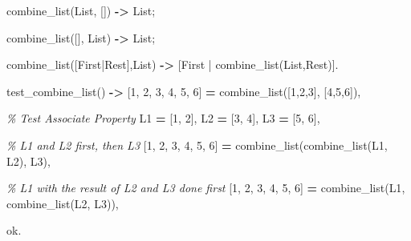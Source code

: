 \documentclass[
]{book}
\newenvironment{Shaded}{\begin{snugshade}}{\end{snugshade}}
\newcommand{\CharTok}[1]{\textcolor[rgb]{0.31,0.60,0.02}{#1}}
\newcommand{\CommentTok}[1]{\textcolor[rgb]{0.56,0.35,0.01}{\textit{#1}}}
\newcommand{\DecValTok}[1]{\textcolor[rgb]{0.00,0.00,0.81}{#1}}
\newcommand{\FunctionTok}[1]{\textcolor[rgb]{0.00,0.00,0.00}{#1}}
\newcommand{\OperatorTok}[1]{\textcolor[rgb]{0.81,0.36,0.00}{\textbf{#1}}}
\newcommand{\VariableTok}[1]{\textcolor[rgb]{0.00,0.00,0.00}{#1}}
\begin{document}
\begin{Shaded}
\begin{Highlighting}[]
\FunctionTok{combine\_list(}\VariableTok{List}\FunctionTok{,} \FunctionTok{[])} \OperatorTok{{-}\textgreater{}} \VariableTok{List}\FunctionTok{;}

\FunctionTok{combine\_list([],} \VariableTok{List}\FunctionTok{)} \OperatorTok{{-}\textgreater{}} \VariableTok{List}\FunctionTok{;}

\FunctionTok{combine\_list([}\VariableTok{First}\FunctionTok{|}\VariableTok{Rest}\FunctionTok{],}\VariableTok{List}\FunctionTok{)} \OperatorTok{{-}\textgreater{}} \FunctionTok{[}\VariableTok{First} \FunctionTok{|} \FunctionTok{combine\_list(}\VariableTok{List}\FunctionTok{,}\VariableTok{Rest}\FunctionTok{)].}

\FunctionTok{test\_combine\_list()} \OperatorTok{{-}\textgreater{}}
    \FunctionTok{[}\DecValTok{1}\FunctionTok{,} \DecValTok{2}\FunctionTok{,} \DecValTok{3}\FunctionTok{,} \DecValTok{4}\FunctionTok{,} \DecValTok{5}\FunctionTok{,} \DecValTok{6}\FunctionTok{]} \OperatorTok{=} \FunctionTok{combine\_list([}\DecValTok{1}\FunctionTok{,}\DecValTok{2}\FunctionTok{,}\DecValTok{3}\FunctionTok{],} \FunctionTok{[}\DecValTok{4}\FunctionTok{,}\DecValTok{5}\FunctionTok{,}\DecValTok{6}\FunctionTok{]),}

    \CommentTok{\% Test Associate Property}
    \VariableTok{L1} \OperatorTok{=} \FunctionTok{[}\DecValTok{1}\FunctionTok{,} \DecValTok{2}\FunctionTok{],}
    \VariableTok{L2} \OperatorTok{=} \FunctionTok{[}\DecValTok{3}\FunctionTok{,} \DecValTok{4}\FunctionTok{],}
    \VariableTok{L3} \OperatorTok{=} \FunctionTok{[}\DecValTok{5}\FunctionTok{,} \DecValTok{6}\FunctionTok{],}
    
    \CommentTok{\% L1 and L2 first, then L3}
    \FunctionTok{[}\DecValTok{1}\FunctionTok{,} \DecValTok{2}\FunctionTok{,} \DecValTok{3}\FunctionTok{,} \DecValTok{4}\FunctionTok{,} \DecValTok{5}\FunctionTok{,} \DecValTok{6}\FunctionTok{]} \OperatorTok{=} \FunctionTok{combine\_list(combine\_list(}\VariableTok{L1}\FunctionTok{,} \VariableTok{L2}\FunctionTok{),} \VariableTok{L3}\FunctionTok{),}

    \CommentTok{\% L1 with the result of L2 and L3 done first}
    \FunctionTok{[}\DecValTok{1}\FunctionTok{,} \DecValTok{2}\FunctionTok{,} \DecValTok{3}\FunctionTok{,} \DecValTok{4}\FunctionTok{,} \DecValTok{5}\FunctionTok{,} \DecValTok{6}\FunctionTok{]} \OperatorTok{=} \FunctionTok{combine\_list(}\VariableTok{L1}\FunctionTok{,} \FunctionTok{combine\_list(}\VariableTok{L2}\FunctionTok{,} \VariableTok{L3}\FunctionTok{)),}

    \CharTok{ok}\FunctionTok{.}
\end{Highlighting}
\end{Shaded}
\end{document}
